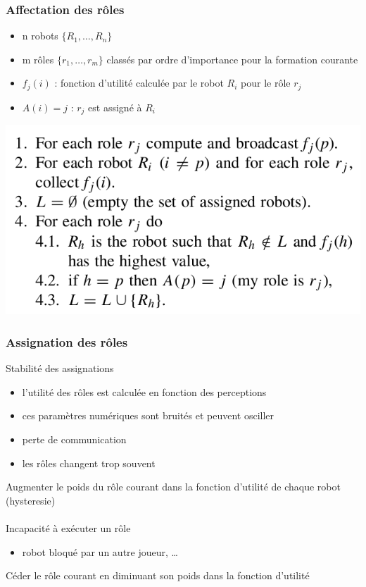 \documentclass{beamer}
\begin{document}
\begin{frame}
\frametitle{Affectation des rôles}
\begin{itemize}
	\item n robots $\{R_1, \dots, R_n\}$
	\item m rôles $\{r_1, \dots, r_m\}$ classés par ordre d'importance pour la formation courante
	\item $f_j(i)$ : fonction d'utilité calculée par le robot $R_i$ pour le rôle $r_j$
	\item $A(i) = j$ : $r_j$ est assigné à $R_i$
\end{itemize}
\begin{center}
    \includegraphics[width=.70\linewidth]{images/algo}
\end{center}
\end{frame}


\begin{frame}
\frametitle{Assignation des rôles}
Stabilité des assignations
\begin{itemize}
    \item l'utilité des rôles est calculée en fonction des perceptions
    \item ces paramètres numériques sont bruités et peuvent osciller
    \item perte de communication
    \item les rôles changent trop souvent
\end{itemize}
Augmenter le poids du rôle courant dans la fonction d'utilité de chaque robot (hysteresie)\\
~\\
Incapacité à exécuter un rôle
\begin{itemize}
    \item robot bloqué par un autre joueur, \dots
\end{itemize}
Céder le rôle courant en diminuant son poids dans la fonction d'utilité
\end{frame}
\end{document}
